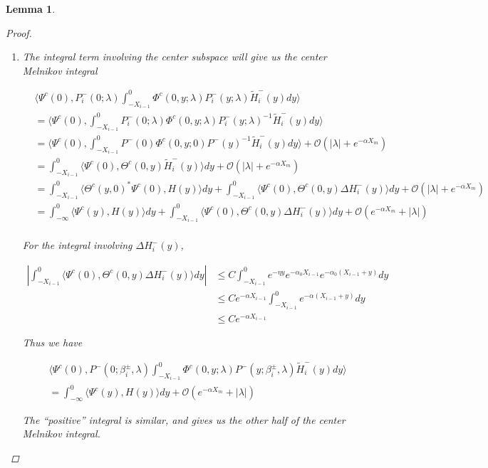 \documentclass[12pt]{article}
\newtheorem{lemma}{Lemma}
\begin{document}
\begin{lemma}
\begin{proof}
\begin{enumerate}
\item The integral term involving the center subspace will give us the center Melnikov integral

\begin{align*}
&\langle \Psi^c(0), P_i^-(0; \lambda) \int_{-X_{i-1}}^0 \Phi^c(0, y; \lambda) P_i^-(y; \lambda) \tilde{H}_i^-(y) dy \rangle \\
&= \langle \Psi^c(0), \int_{-X_{i-1}}^0 P_i^-(0; \lambda) \Phi^c(0, y; \lambda) P_i^-(y; \lambda)^{-1} \tilde{H}_i^-(y) dy \rangle \\
&= \langle \Psi^c(0), \int_{-X_{i-1}}^0 P^-(0) \Phi^c(0, y; 0) P^-(y)^{-1} \tilde{H}_i^-(y) dy \rangle + \mathcal{O}(|\lambda| + e^{-\alpha X_m}) \\
&= \int_{-X_{i-1}}^0 \langle \Psi^c(0), \Theta^c(0, y) \tilde{H}_i^-(y) \rangle dy + \mathcal{O}(|\lambda| + e^{-\alpha X_m}) \\
&= \int_{-X_{i-1}}^0 \langle \Theta^c(y, 0)^* \Psi^c(0), H(y) \rangle dy + \int_{-X_{i-1}}^0 \langle \Psi^c(0), \Theta^c(0, y) \Delta H_i^-(y) \rangle dy + \mathcal{O}(|\lambda| + e^{-\alpha X_m}) \\
&= \int_{-\infty}^0 \langle \Psi^c(y), H(y) \rangle dy + \int_{-X_{i-1}}^0 \langle \Psi^c(0), \Theta^c(0, y) \Delta H_i^-(y) \rangle dy + \mathcal{O}(e^{-\alpha X_m} + |\lambda|) \\
\end{align*}

For the integral involving $\Delta H_i^-(y)$,

\begin{align*}
\left| \int_{-X_{i-1}}^0 \langle \Psi^c(0), \Theta^c(0, y) \Delta H_i^-(y) \rangle dy \right| &\leq C \int_{-X_{i-1}}^0 e^{-\eta y} e^{-\alpha_0 X_{i-1}} e^{-\alpha_0(X_{i-1} + y)} dy \\
&\leq C e^{-\alpha X_{i-1}} \int_{-X_{i-1}}^0 e^{-\alpha(X_{i-1} + y)} dy \\
&\leq C e^{-\alpha X_{i-1}}
\end{align*}

Thus we have

\begin{align*}
&\langle \Psi^c(0), P^-(0; \beta_i^\pm, \lambda) \int_{-X_{i-1}}^0 \Phi^c(0, y; \lambda) P^-(y; \beta_i^\pm, \lambda) \tilde{H}_i^-(y) dy \rangle \\
&= \int_{-\infty}^0 \langle \Psi^c(y), H(y) \rangle dy + \mathcal{O}(e^{-\alpha X_m} + |\lambda|) 
\end{align*}

The ``positive'' integral is similar, and gives us the other half of the center Melnikov integral.


\end{enumerate}
\end{proof}
\end{lemma}
\end{document}
